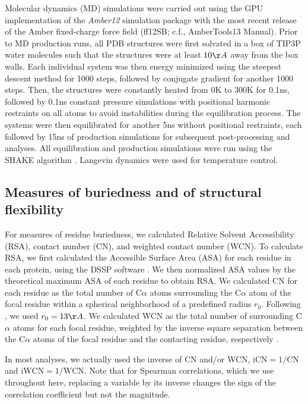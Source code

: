 \documentclass[smallextended]{svjour3}
\begin{document}
Molecular dynamics (MD) simulations were carried out using the GPU implementation of the {\it Amber12} simulation package \citep{SalomonFerreretal2013} with the most recent release of the Amber fixed-charge force field (ff12SB; c.f., AmberTools13 Manual). Prior to MD production runs, all PDB structures were first solvated in a box of TIP3P water molecules \citep{jorgensen1983} such that the structures were  at least $10\AA$ away from the box walls. Each individual system was then energy minimized using the steepest descent method for 1000 steps, followed by conjugate gradient for another 1000 steps. Then, the structures were constantly heated from 0K to 300K for 0.1ns, followed by 0.1ns constant pressure simulations with positional harmonic restraints on all atoms to avoid instabilities during the equilibration process. The systems were then equilibrated for another 5ns without positional restraints, each followed by 15ns of production simulations for subsequent post-processing and analyses. All equilibration and production simulations were run using the SHAKE algorithm \citep{Ryckaert1977}. Langevin dynamics were used for temperature control.


\subsection*{Measures of buriedness and of structural flexibility}

For measures of residue buriedness, we calculated Relative Solvent Accessibility (RSA), contact number (CN), and weighted contact number (WCN). To calculate RSA, we first calculated the Accessible Surface Area (ASA) for each residue in each protein, using the DSSP software \citep{KabschSander1983}. We then normalized ASA values by the theoretical maximum ASA of each residue \citep{Tienetal2013} to obtain RSA. We calculated CN for each residue as the total number of C$\alpha$ atoms surrounding the  C$\alpha$ atom of the focal residue within a spherical neighborhood of a predefined radius $r_0$. Following \citet{Yehetal2014}, we used $r_0=13\AA$. We calculated WCN as the total number of surrounding C$\alpha$ atoms for each focal residue, weighted by the inverse square separation between the C$\alpha$ atoms of the focal residue and the contacting residue, respectively \citep{Shihetal2012}.

In most analyses, we actually used the inverse of CN and/or WCN, $\text{iCN}=1/\text{CN}$ and $\text{iWCN}=1/\text{WCN}$. Note that for Spearman correlations, which we use throughout here, replacing a variable by its inverse changes the sign of the correlation coefficient but not the magnitude.
\end{document}
